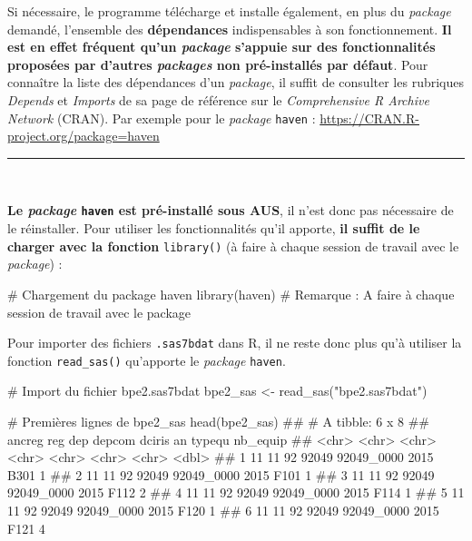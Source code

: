\documentclass[12pt,twosided, notitlepage]{book}
\newenvironment{Shaded}{}{}
\newcommand{\KeywordTok}[1]{\textcolor[rgb]{0.00,0.00,1.00}{#1}}
\newcommand{\StringTok}[1]{\textcolor[rgb]{0.00,0.50,0.50}{#1}}
\newcommand{\CommentTok}[1]{\textcolor[rgb]{0.00,0.50,0.00}{#1}}
\newcommand{\NormalTok}[1]{#1}
\renewenvironment{Shaded}{\begin{snugshade}}{\end{snugshade}}
\begin{document}
Si nécessaire, le programme télécharge et installe également, en plus du
\emph{package} demandé, l'ensemble des \textbf{dépendances}
indispensables à son fonctionnement. \textbf{Il est en effet fréquent
qu'un \emph{package} s'appuie sur des fonctionnalités proposées par
d'autres \emph{packages} non pré-installés par défaut}. Pour connaître
la liste des dépendances d'un \emph{package}, il suffit de consulter les
rubriques \emph{Depends} et \emph{Imports} de sa page de référence sur
le \emph{Comprehensive R Archive Network} (CRAN). Par exemple pour le
\emph{package} \texttt{haven} :
\url{https://CRAN.R-project.org/package=haven}

\begin{center}\rule{0.5\linewidth}{\linethickness}\end{center}

~

\textbf{Le \emph{package} \texttt{haven} est pré-installé sous AUS}, il
n'est donc pas nécessaire de le réinstaller. Pour utiliser les
fonctionnalités qu'il apporte, \textbf{il suffit de le charger avec la
fonction} \texttt{library()} (à faire à
chaque session de travail avec le \emph{package}) :

\begin{Shaded}
\begin{Highlighting}[]
\CommentTok{# Chargement du package haven}
\KeywordTok{library}\NormalTok{(haven)}
\CommentTok{# Remarque : A faire à chaque session de travail avec le package}
\end{Highlighting}
\end{Shaded}

Pour importer des fichiers \texttt{.sas7bdat} dans R, il ne reste donc
plus qu'à utiliser la fonction
\texttt{read\_sas()} qu'apporte le
\emph{package} \texttt{haven}.

\begin{Shaded}
\begin{Highlighting}[]
\CommentTok{# Import du fichier bpe2.sas7bdat}
\NormalTok{bpe2_sas <-}\StringTok{ }\KeywordTok{read_sas}\NormalTok{(}\StringTok{"bpe2.sas7bdat"}\NormalTok{)}

\CommentTok{# Premières lignes de bpe2_sas}
\KeywordTok{head}\NormalTok{(bpe2_sas)}
\NormalTok{  ## # A tibble: 6 x 8}
\NormalTok{  ##   ancreg reg   dep   depcom dciris     an    typequ nb_equip}
\NormalTok{  ##   <chr>  <chr> <chr> <chr>  <chr>      <chr> <chr>     <dbl>}
\NormalTok{  ## 1 11     11    92    92049  92049_0000 2015  B301          1}
\NormalTok{  ## 2 11     11    92    92049  92049_0000 2015  F101          1}
\NormalTok{  ## 3 11     11    92    92049  92049_0000 2015  F112          2}
\NormalTok{  ## 4 11     11    92    92049  92049_0000 2015  F114          1}
\NormalTok{  ## 5 11     11    92    92049  92049_0000 2015  F120          1}
\NormalTok{  ## 6 11     11    92    92049  92049_0000 2015  F121          4}
\end{Highlighting}
\end{Shaded}
\end{document}
